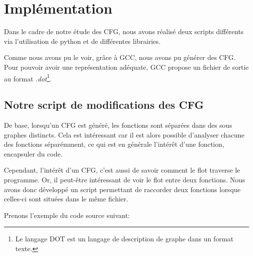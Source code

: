 \section{Implémentation}
Dans le cadre de notre étude des CFG, nous avons réalisé deux scripts différents via l'utilisation de python et de différentes librairies.

Comme nous avons pu le voir, grâce à GCC, nous avons pu générer des CFG. Pour pouvoir avoir une représentation adéquate, GCC propose un fichier de sortie au format \textit{.dot}\footnote{Le langage DOT est un langage de description de graphe dans un format texte.}.
\subsection{Notre script de modifications des CFG}
De base, lorsqu'un CFG est généré, les fonctions sont séparées dans des sous graphes distincts. Cela est intéressant car il est alors possible d'analyser chacune des fonctions séparémment, ce qui est en générale l'intérêt d'une fonction, encapsuler du code.

Cependant, l'intérêt d'un CFG, c'est aussi de savoir comment le flot traverse le programme. Or, il peut-être intéressant de voir le flot entre deux fonctions. Nous avons donc développé un script permettant de raccorder deux fonctions lorsque celles-ci sont situées dans le même fichier.

Prenons l'exemple du code source suivant:


